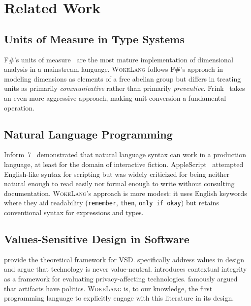\documentclass[11pt,a4paper]{article}
\newcommand{\WokeLang}{\textsc{WokeLang}}
\begin{document}
\section{Related Work}
\label{sec:related}

\subsection{Units of Measure in Type Systems}

F\#'s units of measure~\citep{syme2003units,kennedy1997relational}
are the most mature implementation of dimensional analysis in a
mainstream language.  \WokeLang{} follows F\#'s approach in modeling
dimensions as elements of a free abelian group but differs in
treating units as primarily \emph{communicative} rather than
primarily \emph{preventive}.  Frink~\citep{frink2002} takes an
even more aggressive approach, making unit conversion a fundamental
operation.

\subsection{Natural Language Programming}

Inform~7~\citep{nelson2006natural} demonstrated that natural language
syntax can work in a production language, at least for the domain of
interactive fiction.  AppleScript~\citep{cook2007applescript}
attempted English-like syntax for scripting but was widely criticized
for being neither natural enough to read easily nor formal enough to
write without consulting documentation.  \WokeLang{}'s approach is
more modest: it uses English keywords where they aid readability
(\texttt{remember}, \texttt{then}, \texttt{only if okay}) but retains
conventional syntax for expressions and types.

\subsection{Values-Sensitive Design in Software}

\citet{friedman2013value} provide the theoretical framework for VSD.
\citet{flanagan2005values} specifically address values in
design and argue that technology is never value-neutral.
\citet{nissenbaum2004privacy} introduces contextual integrity as a
framework for evaluating privacy-affecting technologies.
\citet{winner1980artifacts} famously argued that artifacts have
politics.  \WokeLang{} is, to our knowledge, the first programming
language to explicitly engage with this literature in its design.
\end{document}
